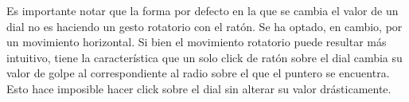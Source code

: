 Es importante notar que la forma por defecto en la que se cambia el valor de un dial no es haciendo un gesto rotatorio con el ratón. Se ha optado, en cambio, por un movimiento horizontal. Si bien el movimiento rotatorio puede resultar más intuitivo, tiene la característica que un solo click de ratón sobre el dial cambia su valor de golpe al correspondiente al radio sobre el que el puntero se encuentra. Esto hace imposible hacer click sobre el dial sin alterar su valor drásticamente.